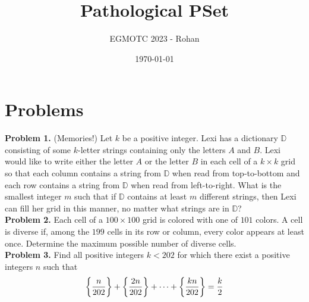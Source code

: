 \documentclass[12pt]{article}
\title{Pathological PSet}
\author{EGMOTC 2023 - Rohan}
\date{\today}
\begin{document}
\maketitle

\newcommand{\localtextbulletone}{\textcolor{black}{\raisebox{.45ex}{\rule{.6ex}{.6ex}}}}
\renewcommand{\labelitemi}{\localtextbulletone}

\section*{Problems}
\vspace{1cm}
\thispagestyle{empty}

\textbf{Problem 1.} (Memories!) Let $k$ be a positive integer. Lexi has a dictionary $\mathbb{D}$ consisting of some $k$-letter strings containing only the letters $A$ and $B$. Lexi would like to write either the letter $A$ or the letter $B$ in each cell of a $k \times k$ grid so that each column contains a string from $\mathbb{D}$ when read from top-to-bottom and each row contains a string from $\mathbb{D}$ when read from left-to-right.
What is the smallest integer $m$ such that if $\mathbb{D}$ contains at least $m$ different strings, then Lexi can fill her grid in this manner, no matter what strings are in $\mathbb{D}$?\\

\textbf{Problem 2.} Each cell of a $100\times 100$ grid is colored with one of $101$ colors. A cell is diverse if, among the $199$ cells in its row or column, every color appears at least once. Determine the maximum possible number of diverse cells.\\

\textbf{Problem 3.} Find all positive integers $k<202$ for which there exist a positive integers $n$ such that
\[\bigg {\{}\frac{n}{202}\bigg {\}}+\bigg {\{}\frac{2n}{202}\bigg {\}}+\cdots +\bigg {\{}\frac{kn}{202}\bigg {\}}=\frac{k}{2}\]
\end{document}
